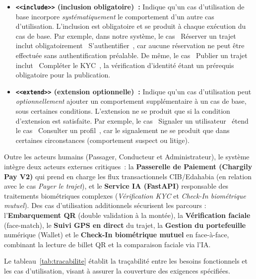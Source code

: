 \begin{itemize}
  \item \textbf{\texttt{\textless\textless include\textgreater\textgreater} (inclusion obligatoire)~:} Indique qu'un cas d'utilisation de base incorpore \textit{systématiquement} le comportement d'un autre cas d'utilisation. L'inclusion est obligatoire et se produit à chaque exécution du cas de base. Par exemple, dans notre système, le cas \guillemotleft~Réserver un trajet~\guillemotright{} inclut obligatoirement \guillemotleft~S'authentifier~\guillemotright, car aucune réservation ne peut être effectuée sans authentification préalable. De même, le cas \guillemotleft~Publier un trajet~\guillemotright{} inclut \guillemotleft~Compléter le KYC~\guillemotright, la vérification d'identité étant un prérequis obligatoire pour la publication.
  \item \textbf{\texttt{\textless\textless extend\textgreater\textgreater} (extension optionnelle)~:} Indique qu'un cas d'utilisation peut \textit{optionnellement} ajouter un comportement supplémentaire à un cas de base, sous certaines conditions. L'extension ne se produit que si la condition d'extension est satisfaite. Par exemple, le cas \guillemotleft~Signaler un utilisateur~\guillemotright{} étend le cas \guillemotleft~Consulter un profil~\guillemotright, car le signalement ne se produit que dans certaines circonstances (comportement suspect ou litige).
\end{itemize}

Outre les acteurs humains (Passager, Conducteur et Administrateur), le système intègre deux acteurs externes critiques~: la \textbf{Passerelle de Paiement (Chargily Pay V2)} qui prend en charge les flux transactionnels CIB/Edahabia (en relation avec le cas \textit{Payer le trajet}), et le \textbf{Service IA (FastAPI)} responsable des traitements biométriques complexes (\textit{Vérification KYC} et \textit{Check-In biométrique mutuel}). Des cas d'utilisation additionnels sécurisent les parcours : l'\textbf{Embarquement QR} (double validation à la montée), la \textbf{Vérification faciale} (face-match), le \textbf{Suivi GPS en direct} du trajet, la \textbf{Gestion du portefeuille} numérique (Wallet) et le \textbf{Check-In biométrique mutuel} en face-à-face, combinant la lecture de billet QR et la comparaison faciale via l'IA.


Le tableau~\ref{tab:tracabilite} établit la traçabilité entre les besoins fonctionnels et les cas d'utilisation, visant à assurer la couverture des exigences spécifiées.

